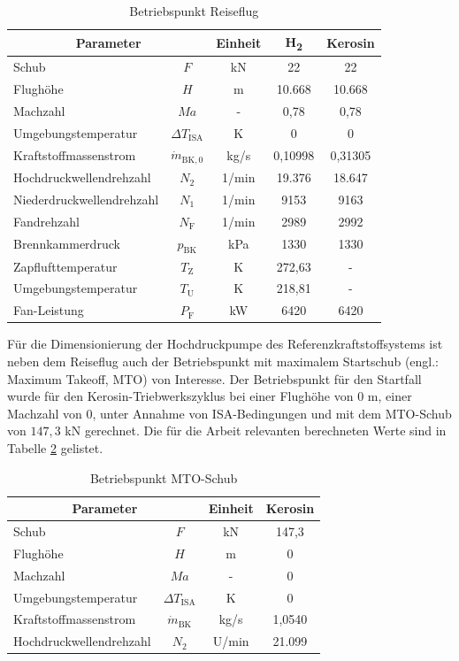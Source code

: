 \begin{table}[ht]
    \centering
	\caption{Betriebspunkt Reiseflug}
	\begin{tabular} {|l|c|c|c|c|} \hline%
    \multicolumn{2}{|c|}{Parameter} & Einheit & H\textsubscript{2} & Kerosin \\ \hline\hline%
    Schub & $F$ & kN & 22 & 22 \\ \hline
    Flughöhe & $H$ & m & 10.668 & 10.668 \\ \hline
    Machzahl & $Ma$ & - & 0,78 & 0,78 \\ \hline
    Umgebungstemperatur & $\Delta T_{\mathrm{ISA}}$ & K & 0 & 0 \\ \hline
    Kraftstoffmassenstrom & $\dot{m}_{\mathrm{BK},0}$& kg/s & 0,10998 & 0,31305 \\ \hline
    Hochdruckwellendrehzahl & $N_2$ & 1/min & 19.376 & 18.647 \\ \hline
    Niederdruckwellendrehzahl & $N_1$ & 1/min & 9153 & 9163 \\ \hline
    Fandrehzahl & $N_\mathrm{F}$ & 1/min & 2989 & 2992 \\ \hline
    Brennkammerdruck & $p_{\mathrm{BK}}$ & kPa & 1330 & 1330 \\ \hline
    Zapflufttemperatur & $T_{\mathrm{Z}}$ & K & 272,63 & - \\ \hline
    Umgebungstemperatur & $T_\mathrm{U}$ & K & 218,81 & - \\ \hline
    Fan-Leistung & $P_\mathrm{F}$ & kW & 6420 & 6420 \\ \hline
    \end{tabular}	
    \label{Tab:cruise}%
\end{table}
\FloatBarrier 

Für die Dimensionierung der Hochdruckpumpe des Referenzkraftstoffsystems ist neben dem Reiseflug auch der Betriebspunkt mit maximalem Startschub (engl.: Maximum Takeoff, MTO) von Interesse. Der Betriebspunkt für den Startfall wurde für den Kerosin-Triebwerkszyklus bei einer Flughöhe von $0$ m, einer Machzahl von $0$, unter Annahme von ISA-Bedingungen und mit dem MTO-Schub von $147,3$ kN gerechnet. Die für die Arbeit relevanten berechneten Werte sind in Tabelle \ref{Tab:mto} gelistet.

\begin{table}[ht]
    \centering
	\caption{Betriebspunkt MTO-Schub}
	\begin{tabular} {|l|c|c|c|} \hline%
    \multicolumn{2}{|c|}{Parameter} & Einheit & Kerosin \\ \hline\hline%
    Schub & $F$ & kN & 147,3 \\ \hline
    Flughöhe & $H$ & m & 0 \\ \hline
    Machzahl & $Ma$ & - & 0 \\ \hline
    Umgebungstemperatur & $\Delta T_{\mathrm{ISA}}$ & K & 0 \\ \hline
    Kraftstoffmassenstrom & $\dot{m}_{\mathrm{BK}}$& kg/s & 1,0540  \\ \hline
    Hochdruckwellendrehzahl & $N_2$ & U/min & 21.099 \\ \hline
    \end{tabular}	
    \label{Tab:mto}%
\end{table}
\FloatBarrier 

